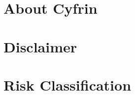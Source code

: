 \hypertarget{about-cyfrin}{%
\section{About Cyfrin}\label{about-cyfrin}}



\hypertarget{disclaimer}{%
\section{Disclaimer}\label{disclaimer}}



\hypertarget{risk-classification}{%
\section{Risk Classification}\label{risk-classification}}


